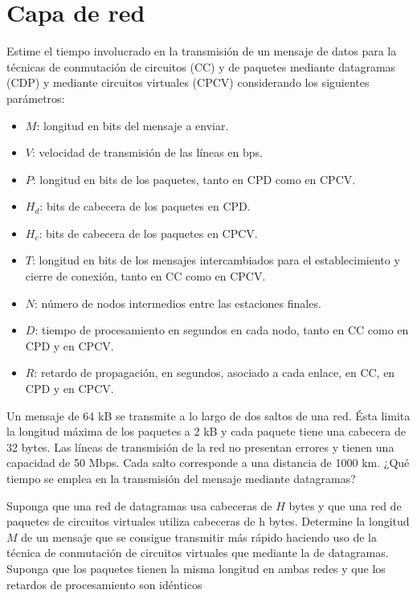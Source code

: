 \section{Capa de red}

\begin{ejercicio}
    Estime el tiempo involucrado en la transmisión de un mensaje de datos para la técnicas de conmutación de circuitos (CC) y de paquetes mediante datagramas (CDP) y mediante circuitos virtuales (CPCV) considerando los siguientes parámetros:
    \begin{itemize}
        \item $M$: longitud en bits del mensaje a enviar.
        \item $V$: velocidad de transmisión de las líneas en bps.
        \item $P$: longitud en bits de los paquetes, tanto en CPD como en CPCV\@.
        \item $H_d$: bits de cabecera de los paquetes en CPD\@.
        \item $H_c$: bits de cabecera de los paquetes en CPCV\@.
        \item $T$: longitud en bits de los mensajes intercambiados para el establecimiento y cierre de conexión, tanto en CC como en CPCV\@.
        \item $N$: número de nodos intermedios entre las estaciones finales.
        \item $D$: tiempo de procesamiento en segundos en cada nodo, tanto en CC como en CPD y en CPCV\@.
        \item $R$: retardo de propagación, en segundos, asociado a cada enlace, en CC, en CPD y en CPCV\@.
    \end{itemize}
\end{ejercicio}

\begin{ejercicio}
    Un mensaje de 64 kB se transmite a lo largo de dos saltos de una red. Ésta limita la longitud máxima de los paquetes a 2 kB y cada paquete tiene una cabecera de 32 bytes. Las líneas de transmisión de la red no presentan errores y tienen una capacidad de 50 Mbps. Cada salto corresponde a una distancia de 1000 km. ¿Qué tiempo se emplea en la transmisión del mensaje mediante datagramas?
\end{ejercicio}

\begin{ejercicio}
    Suponga que una red de datagramas usa cabeceras de $H$ bytes y que una red de paquetes de circuitos virtuales utiliza cabeceras de h bytes. Determine la longitud $M$ de un mensaje que se consigue transmitir más rápido haciendo uso de la técnica de conmutación de circuitos virtuales que mediante la de datagramas. Suponga que los paquetes tienen la misma longitud en ambas redes y que los retardos de procesamiento son idénticos
\end{ejercicio}

